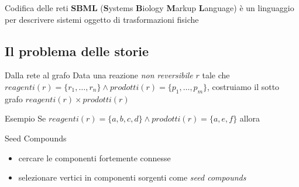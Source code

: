 \documentclass[8pt]{beamer}
\begin{document}
\begin{frame}{Codifica delle reti}%
  \textbf{SBML} (\textbf{S}ystems \textbf{B}iology \textbf{M}arkup
  \textbf{L}anguage) \`e un linguaggio per descrivere sistemi oggetto
  di trasformazioni fisiche
\end{frame}

\subsection{Il problema delle storie}

\begin{frame}{Dalla rete al grafo}
  Data una reazione \emph{non reversibile} $r$ tale che $reagenti(r) =
  \{ r_{1}, \ldots, r_{n} \} \wedge prodotti(r) = \{ p_{1}, \ldots,
  p_{m} \}$, costruiamo il sotto grafo $reagenti(r) \times
  prodotti(r)$
    \begin{block}{Esempio}
      Se $reagenti(r) = \{ a, b, c, d \} \wedge prodotti(r) = \{a, e,
      f\}$ allora
    \end{block}
\end{frame}

\begin{frame}{Seed Compounds}
  \begin{itemize}
  \item cercare le componenti fortemente connesse
  \item selezionare vertici in componenti sorgenti come \emph{seed
      compounds}
  \end{itemize}

\end{frame}
\end{document}
